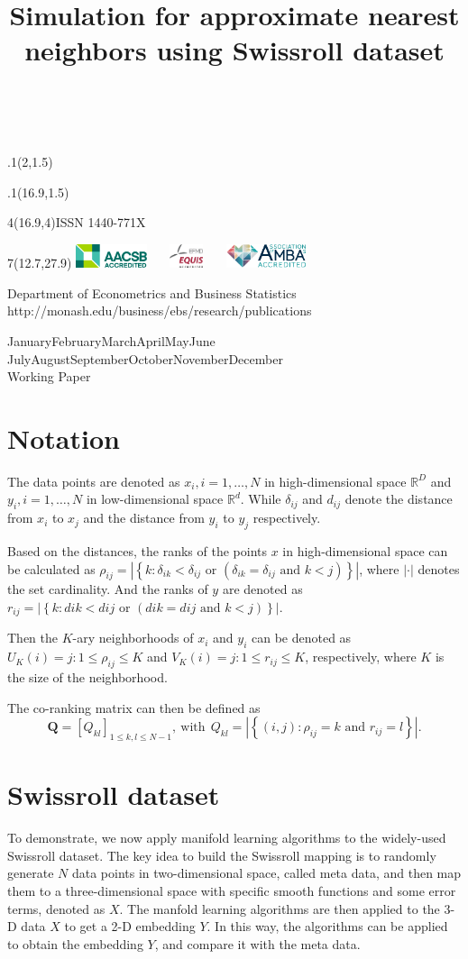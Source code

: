 \documentclass[11pt,a4paper,]{article}
\title{Simulation for approximate nearest neighbors using Swissroll dataset}
\date{\sf\Date~\Month~\Year}
\makeatletter
\def\Date{\number\day}
\def\Month{\ifcase\month\or
 January\or February\or March\or April\or May\or June\or
 July\or August\or September\or October\or November\or December\fi}
\def\Year{\number\year}
\def\showjel{{\large\textsf{\textbf{JEL classification:}}~\@jel}}
\def\cover{{\sffamily\setcounter{page}{0}
        \thispagestyle{empty}
        \placefig{2}{1.5}{width=5cm}{monash2}
        \placefig{16.9}{1.5}{width=2.1cm}{MBusSchool}
        \begin{textblock}{4}(16.9,4)ISSN 1440-771X\end{textblock}
        \begin{textblock}{7}(12.7,27.9)\hfill
        \includegraphics[height=0.7cm]{AACSB}~~~
        \includegraphics[height=0.7cm]{EQUIS}~~~
        \includegraphics[height=0.7cm]{AMBA}
        \end{textblock}
        \vspace*{2cm}
        \begin{center}\Large
        Department of Econometrics and Business Statistics\\[.5cm]
        \footnotesize http://monash.edu/business/ebs/research/publications
        \end{center}\vspace{2cm}
        \begin{center}
        \fbox{\parbox{14cm}{\begin{onehalfspace}\centering\Huge\vspace*{0.3cm}
                \textsf{\textbf{\expandafter{\@title}}}\vspace{1cm}\par
                \LARGE\@author\end{onehalfspace}
        }}
        \end{center}
        \vfill
                \begin{center}\Large
                \Month~\Year\\[1cm]
                Working Paper \@wp
        \end{center}\vspace*{2cm}}}
\def\pageone{{\sffamily\setstretch{1}%
        \thispagestyle{empty}%
        \vbox to \textheight{%
        \raggedright\baselineskip=1.2cm
     {\fontsize{24.88}{30}\sffamily\textbf{\expandafter{\@title}}}
        \vspace{2cm}\par
        \hspace{1cm}\parbox{14cm}{\sffamily\large\@addresses}\vspace{1cm}\vfill
        \hspace{1cm}{\large\Date~\Month~\Year}\\[1cm]
        \hspace{1cm}\showjel\vss}}}
\def\blindtitle{{\sffamily
     \thispagestyle{plain}\raggedright\baselineskip=1.2cm
     {\fontsize{24.88}{30}\sffamily\textbf{\expandafter{\@title}}}\vspace{1cm}\par
        }}
\def\titlepage{{\cover\newpage\pageone\newpage\blindtitle}}
\let\maketitle\titlepage
\def\placefig#1#2#3#4{\begin{textblock}{.1}(#1,#2)\rlap{\texttt{[image: \#4]}}\end{textblock}}
\makeatother
\begin{document}
\maketitle

\hypertarget{notation}{%
\section{Notation}\label{notation}}

The data points are denoted as \(x_i, i=1,\dots,N\) in high-dimensional space \(\mathbb{R}^D\) and \(y_i, i=1,\dots,N\) in low-dimensional space \(\mathbb{R}^d\). While \(\delta_{ij}\) and \(d_{ij}\) denote the distance from \(x_i\) to \(x_j\) and the distance from \(y_i\) to \(y_j\) respectively.

Based on the distances, the ranks of the points \(x\) in high-dimensional space can be calculated as \(\rho_{ij} =|\left\{k: \delta_{i k}<\delta_{i j} \text { or }\left(\delta_{i k}=\delta_{i j} \text { and } k<j\right)\right\} |\), where \(|\cdot|\) denotes the set cardinality. And the ranks of \(y\) are denoted as \(r_{ij} = |\left\{k: d{i k}<d{i j} \text { or }\left(d{i k}=d{i j} \text { and } k<j\right)\right\} |\).

Then the \(K\)-ary neighborhoods of \(x_i\) and \(y_i\) can be denoted as \(U_K(i) = {j: 1 \leq \rho_{ij} \leq K}\) and \(V_K(i) = {j: 1 \leq r_{ij} \leq K}\), respectively, where \(K\) is the size of the neighborhood.

The co-ranking matrix \autocite{Lee2008-sx} can then be defined as
\begin{equation} 
\label{equ:coRanking}
\mathbf{Q}=\left[Q_{k l}\right]_{1 \leqslant k, l \leqslant N-1}, \ \text{with} \ \  Q_{k l}=|\left\{(i, j): \rho_{i j}=k \text { and } r_{i j}=l\right\}|.
\end{equation}

\hypertarget{swissroll-dataset}{%
\section{Swissroll dataset}\label{swissroll-dataset}}

To demonstrate, we now apply manifold learning algorithms to the widely-used Swissroll dataset. The key idea to build the Swissroll mapping is to randomly generate \(N\) data points in two-dimensional space, called meta data, and then map them to a three-dimensional space with specific smooth functions and some error terms, denoted as \(X\). The manfold learning algorithms are then applied to the 3-D data \(X\) to get a 2-D embedding \(Y\). In this way, the algorithms can be applied to obtain the embedding \(Y\), and compare it with the meta data.
\end{document}
